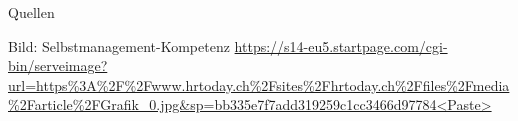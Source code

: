 \begin{frame}{Quellen}
\begin{thebibliography}{10}
     \beamertemplatearticlebibitems
         Bild:
% 
         \newblock Selbstmanagement-Kompetenz \url{https://s14-eu5.startpage.com/cgi-bin/serveimage?url=https%3A%2F%2Fwww.hrtoday.ch%2Fsites%2Fhrtoday.ch%2Ffiles%2Fmedia%2Farticle%2FGrafik_0.jpg&sp=bb335e7f7add319259c1cc3466d97784<Paste>}
% 
% 
% 
% 
% 
% 
% 
%
%
%
    \end{thebibliography}

\end{frame}

